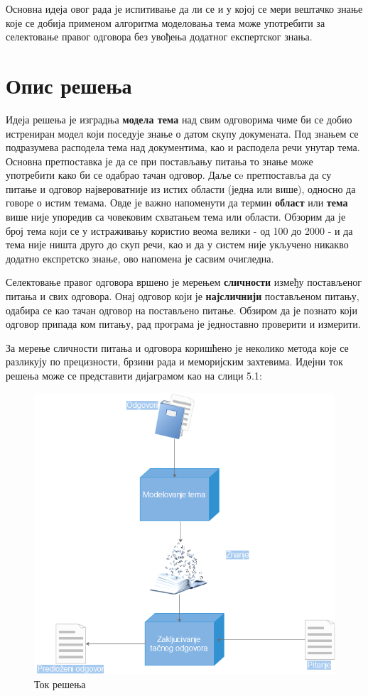 Основна идеја овог рада је испитивање да ли се и у којој се мери вештачко знање које се добија применом алгоритма моделовања тема може употребити за селектовање правог одговора без увођења додатног експертског знања.


\section{Опис решења}

Идеја решења је изградња \textbf{модела тема} над свим одговорима чиме би се добио истрениран модел који поседује знање о датом скупу докумената. Под знањем се подразумева расподела тема над документима, као и расподела речи унутар тема. Основна претпоставка је да се при постављању питања то знање може употребити како би се одабрао тачан одговор. Даље сe претпоставља да су  питање и одговор  највероватније из истих области (једна или више), односно да говоре о истим темама. Овде је важно напоменути да термин \textbf{област} или \textbf{тема} више није упоредив са човековим схватањем тема или области. Обзорим да је број тема који се у истраживању користио веома велики - од 100 до 2000 - и да тема није ништа друго до скуп речи, као и да у систем није укључено никакво додатно експретско знање, ово напомена је сасвим очигледна.

Селектовање правог одговора вршено је мерењем \textbf{сличности} између постављеног питања и свих одговора. Онај одговор који је \textbf{најсличнији} постављеном питању, одабира се као тачан одговор на постављено питање. Обзиром да је познато који одговор припада ком питању, рад програма је једноставно проверити и измерити.

За мерење сличности питања и одговора коришћено је неколико метода које се разликују  по прецизности, брзини рада и меморијским захтевима. Идејни ток решења може се представити  дијаграмом као на слици 5.1:

\begin{figure}[H]
    \centering
   \includegraphics[scale=0.9]{./Slike/slika37.png} 
	\caption{Ток решења}
	\label{fig:slika1}
\end{figure}


